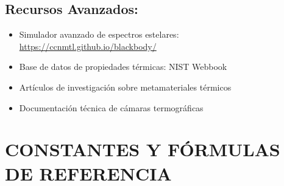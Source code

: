 \documentclass[12pt,a4paper]{article}
\begin{document}
	\subsection{Recursos Avanzados:}
	\begin{itemize}
		\item Simulador avanzado de espectros estelares: \url{https://ccnmtl.github.io/blackbody/}
		\item Base de datos de propiedades térmicas: NIST Webbook
		\item Artículos de investigación sobre metamateriales térmicos
		\item Documentación técnica de cámaras termográficas
	\end{itemize}
	
	
	\section{CONSTANTES Y FÓRMULAS DE REFERENCIA}
	
\end{document}
